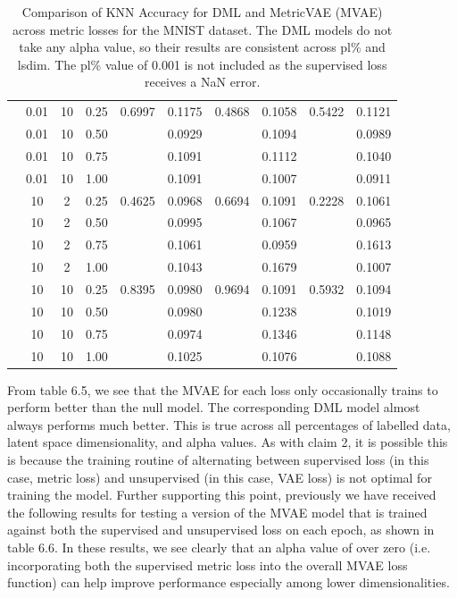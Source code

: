 \documentclass[./dissertation.tex]{subfiles}
\begin{document}
\begin{table}
\begin{tabular}{|c|c|c|c|c|c|c|c|c|c|}
             & 0.01 & 10 & 0.25 & 0.6997 & 0.1175 & 0.4868 & 0.1058 & 0.5422 & 0.1121 \\
             & 0.01 & 10 & 0.50 & & 0.0929 & & 0.1094 & & 0.0989 \\
             & 0.01 & 10 & 0.75 & & 0.1091 & & 0.1112 & & 0.1040 \\
             & 0.01 & 10 & 1.00 & & 0.1091 & & 0.1007 & & 0.0911  \\
             
             & 10 & 2 & 0.25 & 0.4625 & 0.0968 & 0.6694 & 0.1091 & 0.2228 & 0.1061 \\
             & 10 & 2 & 0.50 & & 0.0995 & & 0.1067 & & 0.0965  \\
             & 10 & 2 & 0.75 & & 0.1061 & & 0.0959 & & 0.1613 \\
             & 10 & 2 & 1.00 & & 0.1043 & & 0.1679 & & 0.1007 \\
             
             & 10 & 10 & 0.25 & 0.8395 & 0.0980 & 0.9694 & 0.1091 & 0.5932 & 0.1094 \\
             & 10 & 10 & 0.50 & & 0.0980 & & 0.1238 & & 0.1019 \\
             & 10 & 10 & 0.75 & & 0.0974 & & 0.1346 & & 0.1148 \\
             & 10 & 10 & 1.00 & & 0.1025 & & 0.1076 & & 0.1088 \\
            \hline
       \end{tabular}
       \caption{Comparison of KNN Accuracy for DML and MetricVAE (MVAE) across metric losses for the MNIST dataset. The DML models do not take any alpha value, so their results are consistent across pl\% and lsdim. The pl\% value of 0.001 is not included as the supervised loss receives a NaN error. }
       \label{tab:my_label}
    \end{table}
    
    From table 6.5, we see that the MVAE for each loss only occasionally trains to perform better than the null model. The corresponding DML model almost always performs much better. This is true across all percentages of labelled data, latent space dimensionality, and alpha values. As with claim 2, it is possible this is because the training routine of alternating between supervised loss (in this case, metric loss) and unsupervised (in this case, VAE loss) is not optimal for training the model. Further supporting this point, previously we have received the following results for testing a version of the MVAE model that is trained against both the supervised and unsupervised loss on each epoch, as shown in table 6.6. In these results, we see clearly that an alpha value of over zero (i.e. incorporating both the supervised metric loss into the overall MVAE loss function) can help improve performance especially among lower dimensionalities. 
    
\end{document}
